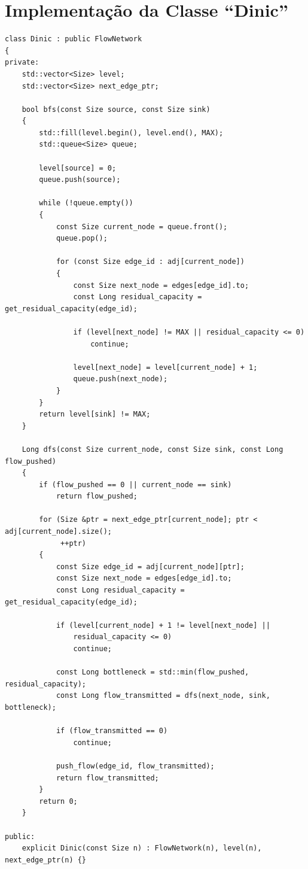 \documentclass[12pt,a4paper]{article}
\begin{document}
\newpage
\section{Implementação da Classe ``Dinic''}
\label{ap:dinic}

\begin{lstlisting}[caption={Implementação em C++ da classe \lstinline{Dinic}, estruturada com Digrafo de Níveis e otimização de ponteiros mortos no cálculo do fluxo bloqueador.}, label={lst:dinic}]
class Dinic : public FlowNetwork
{
private:
	std::vector<Size> level;
	std::vector<Size> next_edge_ptr;

	bool bfs(const Size source, const Size sink)
	{
		std::fill(level.begin(), level.end(), MAX);
		std::queue<Size> queue;

		level[source] = 0;
		queue.push(source);

		while (!queue.empty())
		{
			const Size current_node = queue.front();
			queue.pop();

			for (const Size edge_id : adj[current_node])
			{
				const Size next_node = edges[edge_id].to;
				const Long residual_capacity = get_residual_capacity(edge_id);

				if (level[next_node] != MAX || residual_capacity <= 0)
					continue;

				level[next_node] = level[current_node] + 1;
				queue.push(next_node);
			}
		}
		return level[sink] != MAX;
	}

	Long dfs(const Size current_node, const Size sink, const Long flow_pushed)
	{
		if (flow_pushed == 0 || current_node == sink)
			return flow_pushed;

		for (Size &ptr = next_edge_ptr[current_node]; ptr < adj[current_node].size();
		     ++ptr)
		{
			const Size edge_id = adj[current_node][ptr];
			const Size next_node = edges[edge_id].to;
			const Long residual_capacity = get_residual_capacity(edge_id);

			if (level[current_node] + 1 != level[next_node] ||
			    residual_capacity <= 0)
				continue;

			const Long bottleneck = std::min(flow_pushed, residual_capacity);
			const Long flow_transmitted = dfs(next_node, sink, bottleneck);

			if (flow_transmitted == 0)
				continue;

			push_flow(edge_id, flow_transmitted);
			return flow_transmitted;
		}
		return 0;
	}

public:
	explicit Dinic(const Size n) : FlowNetwork(n), level(n), next_edge_ptr(n) {}


\end{lstlisting}
\end{document}
